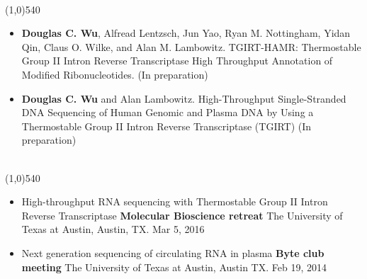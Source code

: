 \documentclass[dvips,11pt]{article}
\begin{document}
\bigskip
{} \vspace{-1.5mm}
\\\noindent
\line(1,0){540}\\
 \vspace{-6mm}
\begin{itemize}
	\setlength{\itemsep}{0pt}
	\item {\bf Douglas C. Wu}, Alfread Lentzsch, Jun Yao, Ryan M. Nottingham, Yidan Qin, Claus O. Wilke, and Alan M. Lambowitz. TGIRT-HAMR: Thermostable Group II Intron Reverse Transcriptase High Throughput Annotation of Modified Ribonucleotides. (In preparation)
	\item {\bf Douglas C. Wu} and Alan Lambowitz. High-Throughput Single-Stranded DNA Sequencing of Human Genomic and Plasma DNA by Using a Thermostable Group II Intron Reverse Transcriptase (TGIRT) (In preparation)
\end{itemize}
\newpage



 \vspace{-1.5mm}
\\\noindent
\line(1,0){540}\\
\vspace{-6mm}
\begin{itemize}
	\setlength{\itemsep}{0pt}
	\item High-throughput RNA sequencing with Thermostable Group II Intron Reverse Transcriptase \newline
		{\bf Molecular Bioscience retreat} \newline
		The University of Texas at Austin, Austin, TX. Mar 5, 2016
	\item Next generation sequencing of circulating RNA in plasma \newline
		{\bf Byte club meeting} \newline
		The University of Texas at Austin, Austin TX. Feb 19, 2014
\end{itemize}
\end{document}
